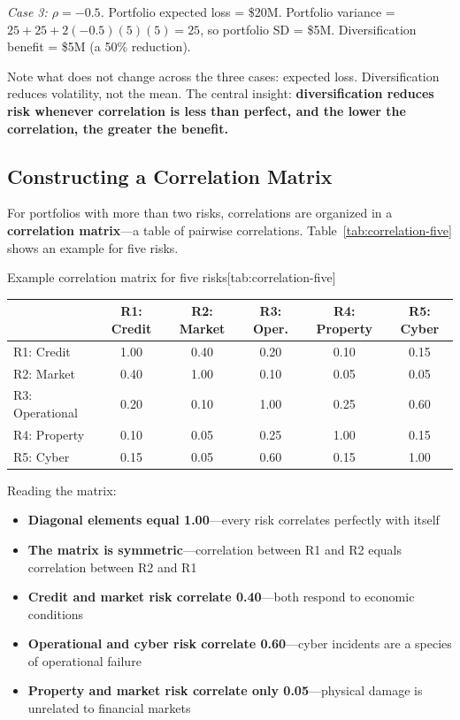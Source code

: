 \documentclass[11pt,openany]{book}
\providecommand{\tightlist}{\setlength{\itemsep}{0pt}\setlength{\parskip}{0pt}}
\begin{document}
\emph{Case 3: \(\rho = -0.5\).} Portfolio expected loss = \$20M. Portfolio
variance = \(25 + 25 + 2(-0.5)(5)(5) = 25\), so portfolio SD = \$5M.
Diversification benefit = \$5M (a 50\% reduction).

Note what does not change across the three cases: expected loss.
Diversification reduces volatility, not the mean. The central insight:
\textbf{diversification reduces risk whenever correlation is less than
perfect, and the lower the correlation, the greater the benefit.}

\subsection{Constructing a Correlation Matrix}
\label{subsec:correlation-matrix}

For portfolios with more than two risks, correlations are organized in a
\textbf{correlation matrix}---a table of pairwise correlations.
Table~\ref{tab:correlation-five} shows an example for five risks.

\begin{ermtable}{Example correlation matrix for five risks}[tab:correlation-five]
\begin{tabular}{@{}lccccc@{}}
\toprule
 & \textbf{R1: Credit} & \textbf{R2: Market} & \textbf{R3: Oper.} &
\textbf{R4: Property} & \textbf{R5: Cyber} \\
\midrule
R1: Credit      & 1.00 & 0.40 & 0.20 & 0.10 & 0.15 \\
R2: Market      & 0.40 & 1.00 & 0.10 & 0.05 & 0.05 \\
R3: Operational & 0.20 & 0.10 & 1.00 & 0.25 & 0.60 \\
R4: Property    & 0.10 & 0.05 & 0.25 & 1.00 & 0.15 \\
R5: Cyber       & 0.15 & 0.05 & 0.60 & 0.15 & 1.00 \\
\bottomrule
\end{tabular}
\end{ermtable}

Reading the matrix:
\begin{itemize}\tightlist
  \item \textbf{Diagonal elements equal 1.00}---every risk correlates
        perfectly with itself
  \item \textbf{The matrix is symmetric}---correlation between R1 and R2
        equals correlation between R2 and R1
  \item \textbf{Credit and market risk correlate 0.40}---both respond to
        economic conditions
  \item \textbf{Operational and cyber risk correlate 0.60}---cyber incidents
        are a species of operational failure
  \item \textbf{Property and market risk correlate only 0.05}---physical
        damage is unrelated to financial markets
\end{itemize}
\end{document}
